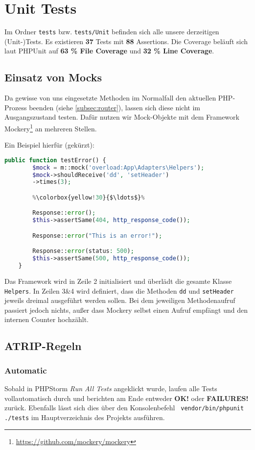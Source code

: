 \documentclass[12pt,a4paper,titlepage,ngerman,pdftex]{report}
\begin{document}
    \section{Unit Tests}
    Im Ordner \verb|tests| bzw. \verb|tests/Unit| befinden sich alle unsere derzeitigen (Unit-)Tests.
    Es existieren \textbf{37} Tests mit \textbf{88} Assertions.
    Die Coverage beläuft sich laut PHPUnit auf \textbf{63 \% File Coverage} und \textbf{32 \% Line Coverage}.

    \subsection{Einsatz von Mocks}
    Da gewisse von uns eingesetzte Methoden im Normalfall den aktuellen PHP-Prozess beenden (siehe \ref{subsec:router}), lassen sich diese nicht im Ausgangszustand testen.
    Dafür nutzen wir Mock-Objekte mit dem Framework Mockery\footnote{\url{https://github.com/mockery/mockery}} an mehreren Stellen.

    Ein Beispiel hierfür (gekürzt):
    \begin{lstlisting}[language=php,label={lst:mockery},escapechar=\%]
    public function testError() {
        $mock = m::mock('overload:App\Adapters\Helpers');
        $mock->shouldReceive('dd', 'setHeader')
        ->times(3);

        %\colorbox{yellow!30}{$\ldots$}%

        Response::error();
        $this->assertSame(404, http_response_code());

        Response::error("This is an error!");

        Response::error(status: 500);
        $this->assertSame(500, http_response_code());
    }
    \end{lstlisting}

    Das Framework wird in Zeile 2 initialisiert und überlädt die gesamte Klasse \verb|Helpers|.
    In Zeilen 3\&4 wird definiert, dass die Methoden \verb|dd| und \verb|setHeader| jeweils dreimal ausgeführt werden sollen.
    Bei dem jeweiligen Methodenaufruf passiert jedoch nichts, außer dass Mockery selbst einen Aufruf empfängt und den internen Counter hochzählt.

    \subsection{ATRIP-Regeln}
    \label{subsec:atrip-regeln}

    \subsubsection{Automatic}
    Sobald in PHPStorm \textit{Run All Tests} angeklickt wurde, laufen alle Tests vollautomatisch durch und berichten am Ende entweder \textbf{OK!} oder \textbf{FAILURES!} zurück.
    Ebenfalls lässt sich dies über den Konsolenbefehl \verb| vendor/bin/phpunit ./tests| im Hauptverzeichnis des Projekts ausführen.
\end{document}
